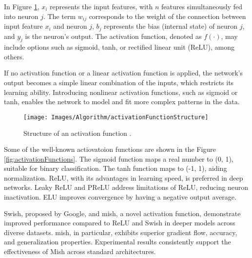 In Figure \ref{fig:activationFunctionStructure}, $x_i$ represents the input features, with $n$ features simultaneously fed into neuron $j$. The term $w_{ij}$ corresponds to the weight of the connection between input feature $x_i$ and neuron $j$, $b_j$ represents the bias (internal state) of neuron $j$, and $y_j$ is the neuron's output. The activation function, denoted as $f(\cdot)$, may include options such as sigmoid, tanh, or rectified linear unit (ReLU), among others.

If no activation function or a linear activation function is applied, the network’s output becomes a simple linear combination of the inputs, which restricts its learning ability. Introducing nonlinear activation functions, such as sigmoid or tanh, enables the network to model and fit more complex patterns in the data.

\begin{figure}[h!]
	\centering
	\texttt{[image: Images/Algorithm/activationFunctionStructure]}
	\caption{Structure of an activation function \cite{Li:2021}.} \label{fig:activationFunctionStructure}
\end{figure}

Some of the well-known actiovatoion functions are shown in the Figure \ref{fig:activationFunctions}. The sigmoid function maps a real number to (0, 1), suitable for binary classification. The tanh function maps to (-1, 1), aiding normalization. ReLU, with its advantages in learning speed, is preferred in deep networks. Leaky ReLU and PReLU address limitations of ReLU, reducing neuron inactivation. ELU improves convergence by having a negative output average.

Swish, proposed by Google, and mish, a novel activation function, demonstrate improved performance compared to ReLU and Swish in deeper models across diverse datasets. mish, in particular, exhibits superior gradient flow, accuracy, and generalization properties. Experimental results consistently support the effectiveness of Mish across standard architectures.

